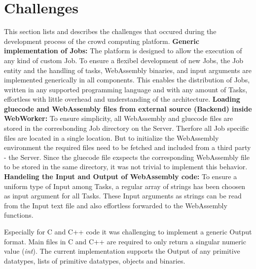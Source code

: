 \section{Challenges}
\label{sec:implementation:challenges}
This section lists and describes the  challenges that occured during the development process of the crowd computing platform.
\newline
\newline
\textbf{Generic implementation of Jobs:}
\newline
The platform is designed to allow the execution of any kind of custom Job. To ensure a flexibel development of new Jobs, the Job entity and the handling of tasks, WebAssembly binaries, and input arguments are implemented generically in all components. This enables the distribution of Jobs, written in any supported programming language and with any amount of Tasks, effortless with little overhead and understanding of the architecture. 
\newline
\newline
\textbf{Loading gluecode and WebAssembly files from external source (Backend) inside WebWorker:}
\newline
To ensure simplicity, all WebAssembly and gluecode files are stored in the corresbonding Job directory on the Server. Therfore all Job specific files are located in a single location. But to initialize the WebAssembly environment the required files need to be fetched and included from a third party - the Server. Since the gluecode file exspects the corresponding WebAssembly file to be stored in the same directory, it was not trivial to implement this behavior.
\newline
\newline
\textbf{Handeling the Input and Output of WebAssembly code:}
\newline
To ensure a uniform type of Input among Tasks, a regular array of strings has been choosen as input argument for all Tasks. These Input arguments as strings can be read from the Input text file and also effortless forwarded to the WebAssembly functions.

Especially for C and C++ code it was challenging to implement a generic Output format. Main files in C and C++ are required to only return a singular numeric value (\emph{int}). The current implementation supports the Output of any primitive datatypes, lists of primitive datatypes, objects and binaries.

